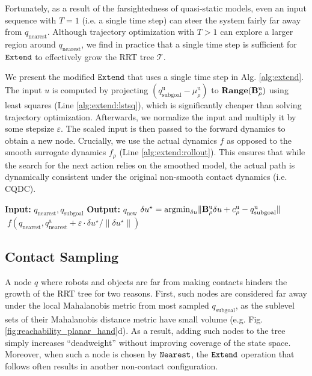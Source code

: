 Fortunately, as a result of the farsightedness of quasi-static models, even an input sequence with $T = 1$ (i.e. a single time step) can steer the system fairly far away from $q_{\mathrm{nearest}}$. Although trajectory optimization with $T > 1$ can explore a larger region around $q_{\mathrm{nearest}}$, we find in practice that a single time step is sufficient for $\mathtt{Extend}$ to effectively grow the RRT tree $\mathcal{T}$.

We present the modified $\mathtt{Extend}$ that uses a single time step in Alg. \ref{alg:extend}. The input $u$ is computed by projecting $(q^\mathrm{u}_{\mathrm{subgoal}} - \mu_\rho^\mathrm{u})$ to $\mathbf{Range}(\mathbf{B}^\mathrm{u}_\rho)$ using least squares (Line \ref{alg:extend:lstsq}), which is significantly cheaper than solving trajectory optimization. Afterwards, we normalize the input and multiply it by some stepsize $\varepsilon$. The scaled input is then passed to the forward dynamics to obtain a new node. Crucially, we use the actual dynamics $f$ as opposed to the smooth surrogate dynamics $f_\rho$ (Line \ref{alg:extend:rollout}). This ensures that while the search for the next action relies on the smoothed model, the actual path is dynamically consistent under the original non-smooth contact dynamics (i.e. CQDC). 

\begin{algorithm}
\caption{$\mathtt{Extend}$}\label{alg:extend}
\textbf{Input:} $q_{\mathrm{nearest}}, q_{\mathrm{subgoal}}$\;  \textbf{Output:} $q_{\mathrm{new}}$\;
$\delta u^\star = \mathrm{argmin}_{\delta u} \|\mathbf{B}^\mathrm{u}_\rho \delta u + c_\rho^\mathrm{u} - q_{\mathrm{subgoal}}^\mathrm{u} \|$ \label{alg:extend:lstsq} \;
\algorithmicreturn  $\; f(q_{\mathrm{nearest}}, q_{\mathrm{nearest}}^\mathrm{a} + \varepsilon \cdot \delta u^\star / \|\delta u^\star\|)$ \label{alg:extend:rollout}\;
\end{algorithm}


\subsection{Contact Sampling}\label{sec:contactsampling}
A node $q$ where robots and objects are far from making contacts hinders the growth of the RRT tree for two reasons. First, such nodes are considered far away under the local Mahalanobis metric from most sampled $q_\mathrm{subgoal}$, as the sublevel sets of their Mahalanobis distance metric have small volume (e.g. Fig. \ref{fig:reachability_planar_hand}d). As a result, adding such nodes to the tree simply increases ``deadweight'' without improving coverage of the state space. Moreover, when such a node is chosen by $\mathtt{Nearest}$, the $\mathtt{Extend}$ operation that follows often results in another non-contact configuration.

